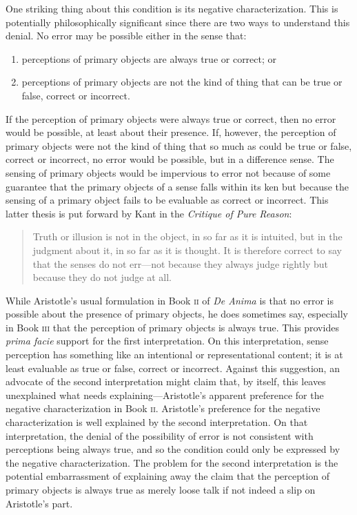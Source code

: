 One striking thing about this condition is its negative characterization. This is potentially philosophically significant since there are two ways to understand this denial. No error may be possible either in the sense that:
\begin{enumerate}[(1)]
	\item perceptions of primary objects are always true or correct; or
	\item perceptions of primary objects are not the kind of thing that can be true or false, correct or incorrect.
\end{enumerate}
If the perception of primary objects were always true or correct, then no error would be possible, at least about their presence. If, however, the perception of primary objects were not the kind of thing that so much as could be true or false, correct or incorrect, no error would be possible, but in a difference sense. The sensing of primary objects would be impervious to error not because of some guarantee that the primary objects of a sense falls within its ken but because the sensing of a primary object fails to be evaluable as correct or incorrect. This latter thesis is put forward by Kant in the \emph{Critique of Pure Reason}:
\begin{quote}
	Truth or illusion is not in the object, in so far as it is intuited, but in the judgment about it, in so far as it is thought. It is therefore correct to say that the senses do not err---not because they always judge rightly but because they do not judge at all. \citep[\textsc{a}294/\textsc{b}350]{Kant:1781fk}
\end{quote}

While Aristotle's usual formulation in Book \textsc{ii} of \emph{De Anima} is that no error is possible about the presence of primary objects, he does sometimes say, especially in Book \textsc{iii} that the perception of primary objects is always true. This provides \emph{prima facie} support for the first interpretation. On this interpretation, sense perception has something like an intentional or representational content; it is at least evaluable as true or false, correct or incorrect. Against this suggestion, an advocate of the second interpretation might claim that, by itself, this leaves unexplained what needs explaining---\-Aristotle's apparent preference for the negative characterization in Book \textsc{ii}. Aristotle's preference for the negative characterization is well explained by the second interpretation. On that interpretation, the denial of the possibility of error is not consistent with perceptions being always true, and so the condition could only be expressed by the negative characterization. The problem for the second interpretation is the potential embarrassment of explaining away the claim that the perception of primary objects is always true as merely loose talk if not indeed a slip on Aristotle's part.

